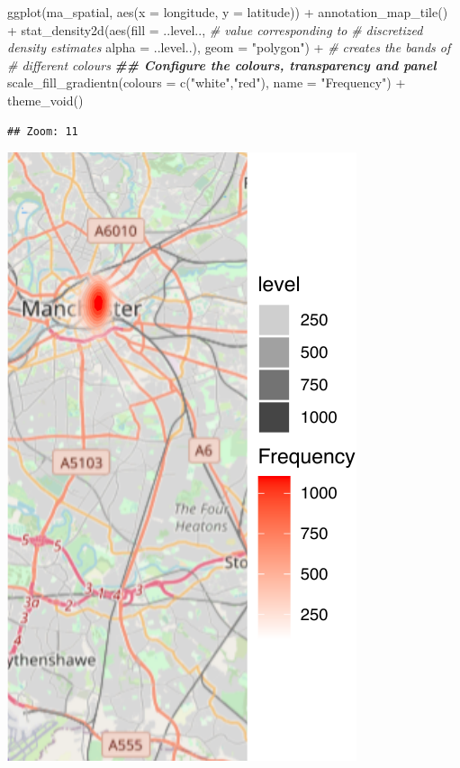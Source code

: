 \documentclass[
  krantz2]{krantz}
\makeatletter
\newenvironment{Shaded}{\begin{snugshade}}{\end{snugshade}}
\newcommand{\AttributeTok}[1]{\textcolor[rgb]{0.61,0.61,0.61}{#1}}
\newcommand{\CommentTok}[1]{\textcolor[rgb]{0.37,0.37,0.37}{\textit{#1}}}
\newcommand{\DocumentationTok}[1]{\textcolor[rgb]{0.37,0.37,0.37}{\textbf{\textit{#1}}}}
\newcommand{\FunctionTok}[1]{\textcolor[rgb]{0,0,0}{#1}}
\newcommand{\NormalTok}[1]{#1}
\newcommand{\SpecialCharTok}[1]{\textcolor[rgb]{0,0,0}{#1}}
\newcommand{\StringTok}[1]{\textcolor[rgb]{0.5,0.5,0.5}{#1}}
\newenvironment{kframe}{%
\medskip{}
\setlength{\fboxsep}{.8em}
 \def\at@end@of@kframe{}%
 \ifinner\ifhmode%
  \def\at@end@of@kframe{\end{minipage}}%
  \begin{minipage}{\columnwidth}%
 \fi\fi%
 \def\FrameCommand##1{\hskip\@totalleftmargin \hskip-\fboxsep
 \colorbox{shadecolor}{##1}\hskip-\fboxsep
     \hskip-\linewidth \hskip-\@totalleftmargin \hskip\columnwidth}%
 \MakeFramed {\advance\hsize-\width
   \@totalleftmargin\z@ \linewidth\hsize
   \@setminipage}}%
 {\par\unskip\endMakeFramed%
 \at@end@of@kframe}
\renewenvironment{Shaded}{\begin{kframe}}{\end{kframe}}
\makeatother
\begin{document}
\begin{Shaded}
\begin{Highlighting}[]
\FunctionTok{ggplot}\NormalTok{(ma\_spatial, }\FunctionTok{aes}\NormalTok{(}\AttributeTok{x =}\NormalTok{ longitude, }\AttributeTok{y =}\NormalTok{ latitude)) }\SpecialCharTok{+} 
  \FunctionTok{annotation\_map\_tile}\NormalTok{() }\SpecialCharTok{+} 
  \FunctionTok{stat\_density2d}\NormalTok{(}\FunctionTok{aes}\NormalTok{(}\AttributeTok{fill =}\NormalTok{ ..level.., }\CommentTok{\# value corresponding to }
                                       \CommentTok{\# discretized density estimates }
                     \AttributeTok{alpha =}\NormalTok{ ..level..), }
                 \AttributeTok{geom =} \StringTok{"polygon"}\NormalTok{) }\SpecialCharTok{+}  \CommentTok{\# creates the bands of }
                                      \CommentTok{\# different colours}
  \DocumentationTok{\#\# Configure the colours, transparency and panel}
  \FunctionTok{scale\_fill\_gradientn}\NormalTok{(}\AttributeTok{colours =} \FunctionTok{c}\NormalTok{(}\StringTok{"white"}\NormalTok{,}\StringTok{"red"}\NormalTok{), }
                       \AttributeTok{name =} \StringTok{"Frequency"}\NormalTok{) }\SpecialCharTok{+} 
  \FunctionTok{theme\_void}\NormalTok{()}
\end{Highlighting}
\end{Shaded}

\begin{verbatim}
## Zoom: 11
\end{verbatim}

\includegraphics{crime_mapping_files/figure-latex/unnamed-chunk-130-1.pdf}
\end{document}
